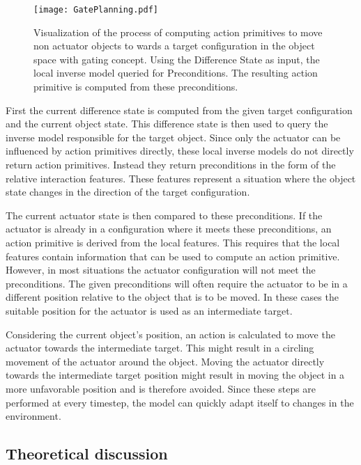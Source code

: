 \begin{figure}
	\centering
	\texttt{[image: GatePlanning.pdf]}
	\caption{Visualization of the process of computing action primitives to move non actuator objects to wards a target configuration in the object space with gating concept. Using the Difference State as input, the local inverse model queried for Preconditions. The resulting action primitive is computed from these preconditions.}
		\label{fig:GatePlanning}
\end{figure}
	
First the current difference state is computed from the given target configuration and the current object state. This difference state is then used to query the inverse model responsible for the target object. Since only the actuator can be influenced by action primitives directly, these local inverse models do not directly return action primitives. Instead they return preconditions in the form of the relative interaction features. These features represent a situation where the object state changes in the direction of the target configuration. 
	
The current actuator state is then compared to these preconditions. If the actuator is already in a configuration where it meets these preconditions, an action primitive is derived from the local features. This requires that the local features contain information that can be used to compute an action primitive.
However, in most situations the actuator configuration will not meet the preconditions. The given preconditions will often require the actuator to be in a different position relative to the object that is to be moved. In these cases the suitable position for the actuator is used as an intermediate target. 

Considering the current object's position, an action is calculated to move the actuator towards the intermediate target. This might result in a circling movement of the actuator around the object. Moving the actuator directly towards the intermediate target position might result in moving the object in a more unfavorable position and is therefore avoided. Since these steps are performed at every timestep, the model can quickly adapt itself to changes in the environment.
	
\subsection{Theoretical discussion \label{sec:gateTheoDisc}}

